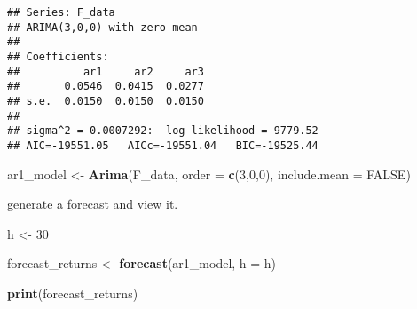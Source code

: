 \documentclass[
]{article}
\newenvironment{Shaded}{\begin{snugshade}}{\end{snugshade}}
\newcommand{\AttributeTok}[1]{\textcolor[rgb]{0.13,0.29,0.53}{#1}}
\newcommand{\ConstantTok}[1]{\textcolor[rgb]{0.56,0.35,0.01}{#1}}
\newcommand{\DecValTok}[1]{\textcolor[rgb]{0.00,0.00,0.81}{#1}}
\newcommand{\FunctionTok}[1]{\textcolor[rgb]{0.13,0.29,0.53}{\textbf{#1}}}
\newcommand{\NormalTok}[1]{#1}
\newcommand{\OtherTok}[1]{\textcolor[rgb]{0.56,0.35,0.01}{#1}}
\begin{document}
\begin{verbatim}
## Series: F_data 
## ARIMA(3,0,0) with zero mean 
## 
## Coefficients:
##          ar1     ar2     ar3
##       0.0546  0.0415  0.0277
## s.e.  0.0150  0.0150  0.0150
## 
## sigma^2 = 0.0007292:  log likelihood = 9779.52
## AIC=-19551.05   AICc=-19551.04   BIC=-19525.44
\end{verbatim}

\begin{Shaded}
\begin{Highlighting}[]
\NormalTok{ar1\_model }\OtherTok{\textless{}{-}} \FunctionTok{Arima}\NormalTok{(F\_data, }\AttributeTok{order =} \FunctionTok{c}\NormalTok{(}\DecValTok{3}\NormalTok{,}\DecValTok{0}\NormalTok{,}\DecValTok{0}\NormalTok{), }\AttributeTok{include.mean =} \ConstantTok{FALSE}\NormalTok{)}
\end{Highlighting}
\end{Shaded}

generate a forecast and view it.

\begin{Shaded}
\begin{Highlighting}[]
\NormalTok{h }\OtherTok{\textless{}{-}} \DecValTok{30}

\NormalTok{forecast\_returns }\OtherTok{\textless{}{-}} \FunctionTok{forecast}\NormalTok{(ar1\_model, }\AttributeTok{h =}\NormalTok{ h)}

\FunctionTok{print}\NormalTok{(forecast\_returns)}
\end{Highlighting}
\end{Shaded}
\end{document}
